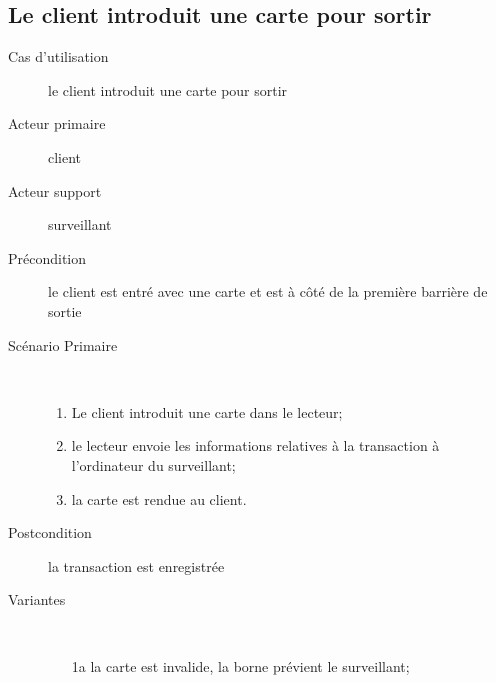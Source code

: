 \documentclass[a4paper]{article}
\begin{document}
\subsection{Le client introduit une carte pour sortir}
\begin{description}
	\item[Cas d'utilisation] le client introduit une carte pour sortir
	\item[Acteur primaire] client
	\item[Acteur support] surveillant
	\item[Pr\'econdition] le client est entr\'e avec une carte et est \`a
		c\^ot\'e de la premi\`ere barri\`ere de sortie
	\item[Sc\'enario Primaire] \
	\begin{enumerate}
		\item Le client introduit une carte dans le lecteur;
		\item le lecteur envoie les informations relatives \`a la transaction
			\`a l'ordinateur du surveillant;
		\item la carte est rendue au client.
	\end{enumerate}
	\item[Postcondition] la transaction est enregistr\'ee
	\item[Variantes] \
	\begin{enumerate}
		\item[1a] la carte est invalide, la borne pr\'evient le surveillant;
	\end{enumerate}
\end{description}
\end{document}
